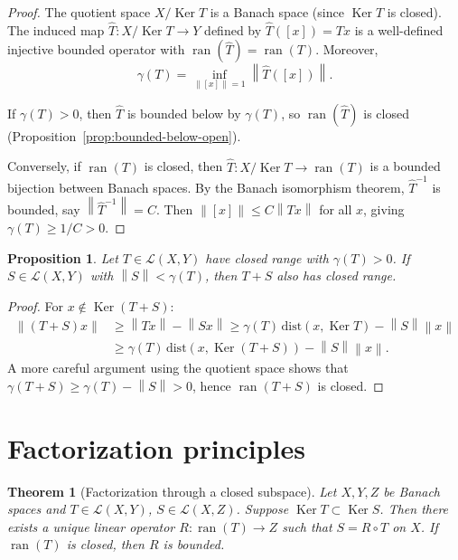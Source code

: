 \documentclass[a4paper,12pt]{book}
\DeclareMathOperator{\Ker}{Ker}
\DeclareMathOperator{\ran}{ran}
\newcommand{\norm}[1]{\left\| #1 \right\|}
\theoremstyle{definition}
\theoremstyle{plain}
\newtheorem{theorem}[definition]{Theorem}
\newtheorem{proposition}[definition]{Proposition}
\theoremstyle{remark}
\begin{document}
\begin{proof}
The quotient space $X/\Ker T$ is a Banach space (since $\Ker T$ is closed). The
induced map $\hat{T} \colon X/\Ker T \to Y$ defined by $\hat{T}([x]) = Tx$ is a
well-defined injective bounded operator with $\ran(\hat{T}) = \ran(T)$. Moreover,
\[
  \gamma(T) = \inf_{\norm{[x]} = 1} \norm{\hat{T}([x])}.
\]

If $\gamma(T) > 0$, then $\hat{T}$ is bounded below by $\gamma(T)$, so $\ran(\hat{T})$
is closed (Proposition~\ref{prop:bounded-below-open}).

Conversely, if $\ran(T)$ is closed, then $\hat{T} \colon X/\Ker T \to \ran(T)$ is
a bounded bijection between Banach spaces. By the Banach isomorphism theorem,
$\hat{T}^{-1}$ is bounded, say $\norm{\hat{T}^{-1}} = C$. Then
$\norm{[x]} \leq C\norm{Tx}$ for all $x$, giving $\gamma(T) \geq 1/C > 0$.
\end{proof}

\begin{proposition}\label{prop:closed-range-perturbation}
Let $T \in \mathcal{L}(X,Y)$ have closed range with $\gamma(T) > 0$. If
$S \in \mathcal{L}(X,Y)$ with $\norm{S} < \gamma(T)$, then $T + S$ also has
closed range.
\end{proposition}

\begin{proof}
For $x \notin \Ker(T+S)$:
\begin{align*}
  \norm{(T+S)x} &\geq \norm{Tx} - \norm{Sx} \geq \gamma(T)\,\mathrm{dist}(x, \Ker T)
  - \norm{S}\norm{x} \\
  &\geq \gamma(T)\,\mathrm{dist}(x, \Ker(T+S)) - \norm{S}\norm{x}.
\end{align*}
A more careful argument using the quotient space shows that $\gamma(T+S) \geq
\gamma(T) - \norm{S} > 0$, hence $\ran(T+S)$ is closed.
\end{proof}

\section{Factorization principles}\label{sec:factorization}

\begin{theorem}[Factorization through a closed subspace]%
\label{thm:factorization}
Let $X, Y, Z$ be Banach spaces and $T \in \mathcal{L}(X,Y)$,
$S \in \mathcal{L}(X,Z)$. Suppose $\Ker T \subset \Ker S$. Then there exists a
unique linear operator $R \colon \ran(T) \to Z$ such that $S = R \circ T$ on $X$.
If $\ran(T)$ is closed, then $R$ is bounded.
\end{theorem}
\end{document}
